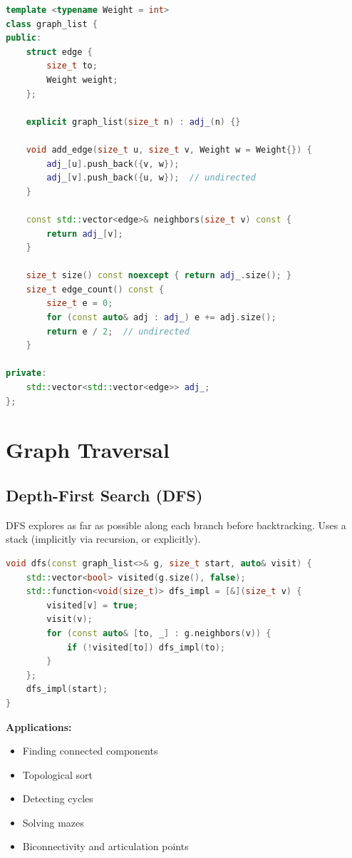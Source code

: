 \begin{lstlisting}[language=C++]
template <typename Weight = int>
class graph_list {
public:
    struct edge {
        size_t to;
        Weight weight;
    };

    explicit graph_list(size_t n) : adj_(n) {}

    void add_edge(size_t u, size_t v, Weight w = Weight{}) {
        adj_[u].push_back({v, w});
        adj_[v].push_back({u, w});  // undirected
    }

    const std::vector<edge>& neighbors(size_t v) const {
        return adj_[v];
    }

    size_t size() const noexcept { return adj_.size(); }
    size_t edge_count() const {
        size_t e = 0;
        for (const auto& adj : adj_) e += adj.size();
        return e / 2;  // undirected
    }

private:
    std::vector<std::vector<edge>> adj_;
};
\end{lstlisting}

\section{Graph Traversal}

\subsection{Depth-First Search (DFS)}

DFS explores as far as possible along each branch before backtracking. Uses a stack (implicitly via recursion, or explicitly).

\begin{lstlisting}[language=C++]
void dfs(const graph_list<>& g, size_t start, auto& visit) {
    std::vector<bool> visited(g.size(), false);
    std::function<void(size_t)> dfs_impl = [&](size_t v) {
        visited[v] = true;
        visit(v);
        for (const auto& [to, _] : g.neighbors(v)) {
            if (!visited[to]) dfs_impl(to);
        }
    };
    dfs_impl(start);
}
\end{lstlisting}

\textbf{Applications:}
\begin{itemize}
\item Finding connected components
\item Topological sort
\item Detecting cycles
\item Solving mazes
\item Biconnectivity and articulation points
\end{itemize}

